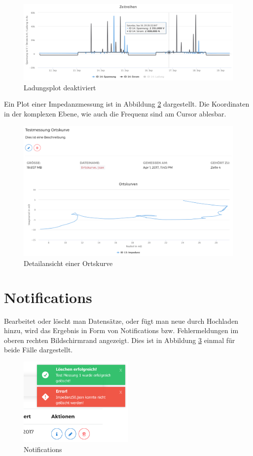 \begin{figure}
\centering
\includegraphics[width=\textwidth]{Figures/legendedeaktiviert}
\caption{Ladungsplot deaktiviert}
\label{fig:legendedeaktiviert}
\end{figure} 


Ein Plot einer Impedanzmessung ist in Abbildung \ref{fig:ortskurve} dargestellt. Die Koordinaten in der komplexen Ebene, wie auch die Frequenz sind am Cursor ablesbar.

\begin{figure}
\centering
\includegraphics[width=\textwidth]{Figures/ortskurve}
\caption{Detailansicht einer Ortskurve}
\label{fig:ortskurve}
\end{figure}

\section{Notifications}

Bearbeitet oder löscht man Datensätze, oder fügt man neue durch Hochladen hinzu, wird das Ergebnis in Form von Notifications bzw. Fehlermeldungen im oberen rechten Bildschirmrand angezeigt. Dies ist in Abbildung \ref{fig:notifications} einmal für beide Fälle dargestellt.

\begin{figure}
\centering
\includegraphics[width=0.5\textwidth]{Figures/notifications}
\caption{Notifications}
\label{fig:notifications}
\end{figure}

